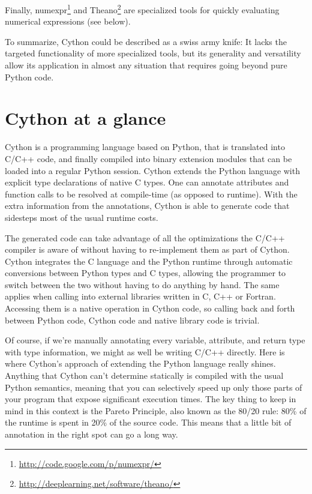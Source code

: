 \documentclass[letterpaper,11pt,english]{article}
\begin{document}
Finally,
numexpr\footnote{\href{http://code.google.com/p/numexpr/}{http://code.google.com/p/numexpr/}}
and
Theano\footnote{\href{http://deeplearning.net/software/theano/}{http://deeplearning.net/software/theano/}} are specialized tools for
quickly evaluating numerical expressions (see below).

To summarize, Cython could be described as a swiss army knife: It
lacks the targeted functionality of more specialized tools, but its
generality and versatility allow its application in almost any
situation that requires going beyond pure Python code.


\section{Cython at a glance}

Cython is a programming language based on Python, that is translated
into C/C++ code, and finally compiled into binary extension modules
that can be loaded into a regular Python session.  Cython extends the
Python language with explicit type declarations of native C types.
One can annotate attributes and function calls to be resolved at
compile-time (as opposed to runtime).  With the extra information from
the annotations, Cython is able to generate code that sidesteps most
of the usual runtime costs.

The generated code can take advantage of all the optimizations the
C/C++ compiler is aware of without having to re-implement them as part
of Cython.  Cython integrates the C language and the Python runtime
through automatic conversions between Python types and C types,
allowing the programmer to switch between the two without having to do
anything by hand.  The same applies when calling into external
libraries written in C, C++ or Fortran.  Accessing them is a native
operation in Cython code, so calling back and forth between Python
code, Cython code and native library code is trivial.

Of course, if we're manually annotating every variable, attribute, and
return type with type information, we might as well be writing C/C++
directly.  Here is where Cython's approach of extending the Python
language really shines.  Anything that Cython can't determine
statically is compiled with the usual Python semantics, meaning that
you can selectively speed up only those parts of your program that
expose significant execution times.  The key thing to keep in mind in
this context is the Pareto Principle, also known as the 80/20 rule:
80\% of the runtime is spent in 20\% of the source code.  This means
that a little bit of annotation in the right spot can go a long way.
\end{document}
